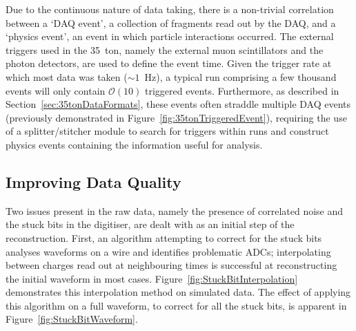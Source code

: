 Due to the continuous nature of data taking, there is a non-trivial correlation between a `DAQ event', a collection of fragments read out by the DAQ, and a `physics event', an event in which particle interactions occurred.  The external triggers used in the 35~ton, namely the external muon scintillators and the photon detectors, are used to define the event time.  Given the trigger rate at which most data was taken ($\sim1$~Hz), a typical run comprising a few thousand events will only contain $\mathcal{O}(10)$ triggered events.  Furthermore, as described in Section~\ref{sec:35tonDataFormats}, these events often straddle multiple DAQ events (previously demonstrated in Figure~\ref{fig:35tonTriggeredEvent}), requiring the use of a splitter/stitcher module to search for triggers within runs and construct physics events containing the information useful for analysis.

\subsection{Improving Data Quality}\label{sec:ImprovingDataQuality}

Two issues present in the raw data, namely the presence of correlated noise and the stuck bits in the digitiser, are dealt with as an initial step of the reconstruction.  First, an algorithm attempting to correct for the stuck bits analyses waveforms on a wire and identifies problematic ADCs; interpolating between charges read out at neighbouring times is successful at reconstructing the initial waveform in most cases.  Figure~\ref{fig:StuckBitInterpolation} demonstrates this interpolation method on simulated data.  The effect of applying this algorithm on a full waveform, to correct for all the stuck bits, is apparent in Figure~\ref{fig:StuckBitWaveform}.

